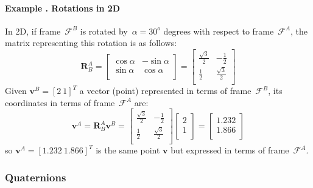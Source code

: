 \paragraph{Example \theexamplecounter. Rotations in 2D}
In 2D, if frame~$\mathcal{F}^B$ is rotated by~$\alpha=30^o$ degrees with respect to frame~$\mathcal{F}^A$, the matrix representing this rotation is as follows: 
\begin{equation}
\mathbf{R}^A_B = 
\left[
\begin{array}{cc}
  \cos\alpha & -\sin\alpha\\
  \sin\alpha & \cos\alpha\\
\end{array}
\right] = 
\left[
\begin{array}{cc}
  \frac{\sqrt{3}}{2} & -\frac{1}{2}\\
  \frac{1}{2} & \frac{\sqrt{3}}{2}\\
\end{array}
\right] 
\end{equation}
Given $\mathbf{v}^B = [2\ 1]^T$ a vector (point) represented in terms of frame~$\mathcal{F}^B$, its coordinates in terms of frame~$\mathcal{F}^A$ are:
\begin{equation}
 \mathbf{v}^A = \mathbf{R}^A_B \mathbf{v}^B =
\left[
\begin{array}{cc}
  \frac{\sqrt{3}}{2} & -\frac{1}{2}\\
  \frac{1}{2} & \frac{\sqrt{3}}{2}\\
\end{array}
\right]
\left[
\begin{array}{c}
 2 \\
 1\\
\end{array}
\right] =
\left[
\begin{array}{c}
 1.232 \\
 1.866\\
\end{array}
\right]
\end{equation}
so $\mathbf{v}^A=[1.232\ 1.866]^T$ is the same point $\mathbf{v}$ but expressed in terms of frame~$\mathcal{F}^A$.


\subsubsection{Quaternions}
